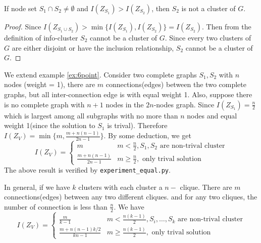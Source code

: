 \documentclass{article}
\begin{document}
\begin{proposition}\label{prop:sub}
If node set $S_1 \cap S_2 \neq \emptyset$ and $I(Z_{S_1}) > I(Z_{S_2})$, then $S_2$ is not a cluster of $G$.
\end{proposition}
\begin{proof}
Since $I(Z_{S_1\cup S_2}) > \min\{I(Z_{S_1}), I(Z_{S_2})\} = I(Z_{S_2})$. Then from the definition of info-cluster $S_2$ cannot be a cluster of $G$.
Since every two clusters of $G$ are either disjoint or have the inclusion relationship, $S_2$ cannot be a cluster of $G$.
\end{proof}
\begin{example}\label{ex:2c}
We extend example \ref{ex:6point}. Consider two complete graphs $S_1, S_2$ with $n$ nodes (weight = 1), there are $m$ connections(edges) between the two complete graphs, but all inter-connection edge is with equal weight 1. Also, suppose there is no complete graph with $n+1$ nodes in the $2n$-nodes graph. Since $I(Z_{S_1})=\frac{n}{2}$ which is largest among all subgraphs with no more than $n$ nodes and equal weight 1(since the solution to $S_1$ is trival). Therefore $I(Z_V) = \min\{m, \frac{m+n(n-1)}{2n-1}\}$. By some deduction, we get
\begin{equation}\label{eq:ee}
I(Z_V) = \begin{cases}
m & m <\frac{n}{2}, S_1,S_2 \textrm{ are non-trival cluster} \\
\frac{m+n(n-1)}{2n-1} & m\geq \frac{n}{2}, \textrm{ only trival solution} 
\end{cases}
\end{equation}
The above result is verified by \texttt{experiment\_equal.py}.

In general, if we have $k$ clusters with each cluster a $n-$ clique. There are $m$ connections(edges) between any two different cliques.  and for any two cliques, the number of connection is less than $\frac{n}{2}$.
We have
\begin{equation}\label{eq:me}
I(Z_V) = \begin{cases}
\frac{m}{k-1} & m <\frac{n(k-1)}{2}, S_i,\dots, S_k \textrm{ are non-trival cluster} \\
\frac{m+n(n-1)k/2}{kn-1} & m\geq \frac{n(k-1)}{2}, \textrm{ only trival solution} 
\end{cases}
\end{equation}
\end{example}
\end{document}
